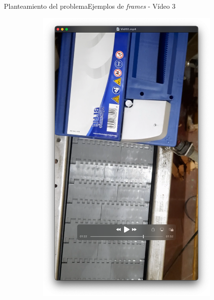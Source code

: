 \documentclass{beamer}
\begin{document}
\begin{frame}{Planteamiento del problema}{Ejemplos de \textit{frames} - Vídeo 3}
\begin{figure}
\begin{subfigure}[b]{0.4\textwidth}
        \includegraphics[width=\textwidth]{img/B6.png}
    \end{subfigure}
\end{figure}
\end{frame}
\end{document}
